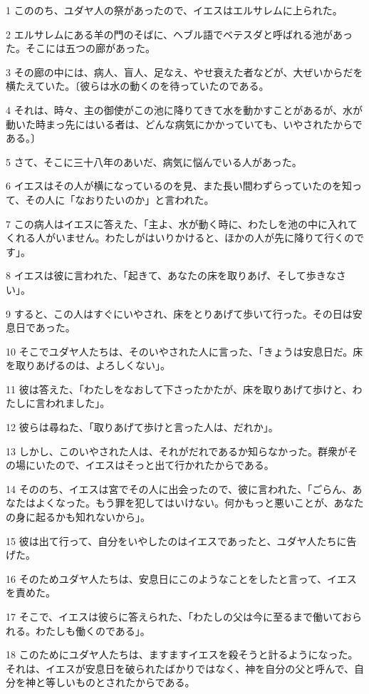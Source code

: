 \par 1 こののち、ユダヤ人の祭があったので、イエスはエルサレムに上られた。
\par 2 エルサレムにある羊の門のそばに、ヘブル語でベテスダと呼ばれる池があった。そこには五つの廊があった。
\par 3 その廊の中には、病人、盲人、足なえ、やせ衰えた者などが、大ぜいからだを横たえていた。〔彼らは水の動くのを待っていたのである。
\par 4 それは、時々、主の御使がこの池に降りてきて水を動かすことがあるが、水が動いた時まっ先にはいる者は、どんな病気にかかっていても、いやされたからである。〕
\par 5 さて、そこに三十八年のあいだ、病気に悩んでいる人があった。
\par 6 イエスはその人が横になっているのを見、また長い間わずらっていたのを知って、その人に「なおりたいのか」と言われた。
\par 7 この病人はイエスに答えた、「主よ、水が動く時に、わたしを池の中に入れてくれる人がいません。わたしがはいりかけると、ほかの人が先に降りて行くのです」。
\par 8 イエスは彼に言われた、「起きて、あなたの床を取りあげ、そして歩きなさい」。
\par 9 すると、この人はすぐにいやされ、床をとりあげて歩いて行った。その日は安息日であった。
\par 10 そこでユダヤ人たちは、そのいやされた人に言った、「きょうは安息日だ。床を取りあげるのは、よろしくない」。
\par 11 彼は答えた、「わたしをなおして下さったかたが、床を取りあげて歩けと、わたしに言われました」。
\par 12 彼らは尋ねた、「取りあげて歩けと言った人は、だれか」。
\par 13 しかし、このいやされた人は、それがだれであるか知らなかった。群衆がその場にいたので、イエスはそっと出て行かれたからである。
\par 14 そののち、イエスは宮でその人に出会ったので、彼に言われた、「ごらん、あなたはよくなった。もう罪を犯してはいけない。何かもっと悪いことが、あなたの身に起るかも知れないから」。
\par 15 彼は出て行って、自分をいやしたのはイエスであったと、ユダヤ人たちに告げた。
\par 16 そのためユダヤ人たちは、安息日にこのようなことをしたと言って、イエスを責めた。
\par 17 そこで、イエスは彼らに答えられた、「わたしの父は今に至るまで働いておられる。わたしも働くのである」。
\par 18 このためにユダヤ人たちは、ますますイエスを殺そうと計るようになった。それは、イエスが安息日を破られたばかりではなく、神を自分の父と呼んで、自分を神と等しいものとされたからである。
